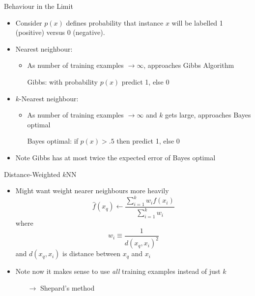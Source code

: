 \documentclass[%
pdf,
colorBG,
slideColor,
tcrico,
]{prosper}
\begin{document}
\begin{slide}{Behaviour in the Limit }
\tiny
\begin{itemize}
 \item Consider $p(x)$ defines probability that instance $x$ will be labelled 1 (positive) versus 0 (negative).
\item  Nearest neighbour: 
	\begin{itemize} 
	\item As number of training examples $\rightarrow \infty$,
	approaches Gibbs Algorithm
	\item[] Gibbs: with probability $p(x)$ predict 1, else 0
	\end{itemize}
\item  $k$-Nearest neighbour: 
	\begin{itemize} 
	\item As number of training examples $\rightarrow \infty$ and $k$ gets large, approaches Bayes optimal
	\item[] Bayes optimal: if $p(x)>.5$ then predict 1, else 0
	\end{itemize}
\item  Note Gibbs has at most twice the expected error of Bayes optimal
\end{itemize}
\end{slide}


\begin{slide}{Distance-Weighted $k$NN }
\tiny
\begin{itemize}
 \item  Might want weight nearer neighbours more heavily  
\[ \hat{f}(x_{q}) \leftarrow  \frac{\sum_{i=1}^{k} w_{i} f(x_{i})}{\sum_{i=1}^{k} w_{i}} \]
where
\[ w_{i} \equiv \frac{1}{d(x_{q}, x_{i})^{2}} \]
and $d(x_{q}, x_{i})$ is distance between $x_{q}$ and $x_{i}$
\item  Note now it makes sense to use {\em all} training examples instead of just $k$
\begin{itemize} \item[$\rightarrow$]Shepard's method \end{itemize}
\end{itemize}
\end{slide}

\end{document}
